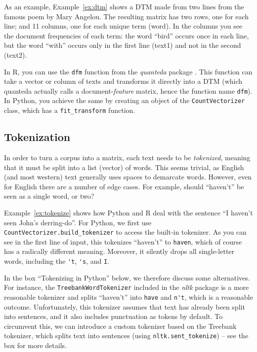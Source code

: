 
As an example, Example~\ref{ex:dtm} shows a DTM made from two lines from the famous poem by Mary Angelou.
The resulting matrix has two rows, one for each line; and 11 columns, one for each unique term (word).
In the columns you see the document frequencies of each term: the word ``bird'' occurs once in each line,
but the word ``with'' occurs only in the first line (text1) and not in the second (text2).

In R, you can use the \texttt{dfm} function from the \emph{quanteda} package \citep{quanteda}.
This function can take a vector or column of texts and transforms it directly into a DTM
(which quanteda actually calls a document-\emph{feature} matrix, hence the function name \texttt{dfm}).
In Python, you achieve the same by creating an object of the \texttt{CountVectorizer} class, which has a \texttt{fit\_transform} function.


\subsection{Tokenization}\label{sec:tokenizations}

In order to turn a corpus into a matrix, each text needs to be \emph{tokenized},
meaning that it must be split into a list (vector) of words.
This seems trivial, as English (and most western) text generally uses spaces to demarcate words.
However, even for English there are a number of edge cases.
For example, should ``haven't'' be seen as a single word, or two?


Example~\ref{ex:tokenize} shows how Python and R deal with the sentence ``I haven't seen John's derring-do''.
For Python, we first use \verb|CountVectorizer.build_tokenizer| to access the built-in tokenizer.
As you can see in the first line of input, this tokenizes ``haven't'' to \verb|haven|,
which of course has a radically different meaning. Moreover, it silently drops all single-letter words,
including the \verb|'t|, \verb|'s|, and \verb|I|.

In the box ``Tokenizing in Python'' below, we therefore discuss some alternatives.
For instance, the \texttt{TreebankWordTokenizer} included in the \emph{nltk} package is a more reasonable tokenizer and
splits ``haven't'' into \verb|have| and \verb|n't|, which is a reasonable outcome.
Unfortunately, this tokenizer assumes that text has already been split into sentences,
and it also includes punctuation as tokens by default.
To circumvent this, we can introduce a custom tokenizer based on the Treebank tokenizer,
which splits text into sentences (using \texttt{nltk.sent\_tokenize}) -- see the box for more details.

